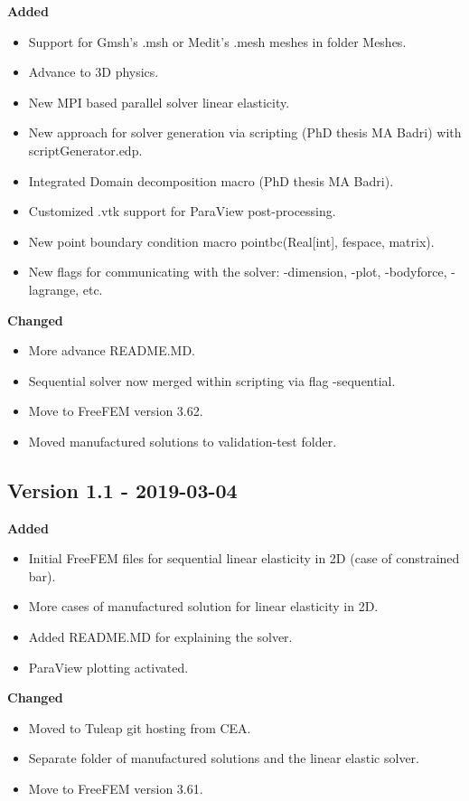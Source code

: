 \textbf{Added}
\begin{itemize}
\item Support for Gmsh's {\ttfamily .msh}  or Medit's {\ttfamily .mesh} meshes in folder {\ttfamily Meshes}.
\item Advance to 3D physics.
\item New MPI based parallel solver linear elasticity.
\item New approach for solver generation via scripting (PhD thesis MA Badri) with {\ttfamily scriptGenerator.edp}.
\item Integrated Domain decomposition macro (PhD thesis MA Badri).
\item Customized {\ttfamily .vtk} support for ParaView post-processing.
\item New point boundary condition macro {\ttfamily pointbc(Real[int], fespace, matrix)}.
\item New flags for communicating with the solver: {\ttfamily -dimension}, {\ttfamily -plot}, {\ttfamily -bodyforce}, {\ttfamily -lagrange}, etc.
\end{itemize}

\textbf{Changed}
\begin{itemize}
\item More advance README.MD.
\item Sequential solver now merged within scripting via flag {\ttfamily -sequential}.
\item Move to FreeFEM version 3.62.
\item Moved manufactured solutions to {\ttfamily validation-test} folder.
\end{itemize}

\subsection{Version 1.1 - 2019-03-04}

\textbf{Added}
\begin{itemize}
\item Initial FreeFEM files for sequential linear elasticity in 2D (case of constrained bar).
\item More cases of manufactured solution for linear elasticity in 2D.
\item Added {\ttfamily README.MD} for explaining the solver.
\item ParaView plotting activated.
\end{itemize}

\textbf{Changed}
\begin{itemize}
\item Moved to Tuleap git hosting from CEA.
\item Separate folder of manufactured solutions and the linear elastic solver.
\item Move to FreeFEM version 3.61.
\end{itemize}

